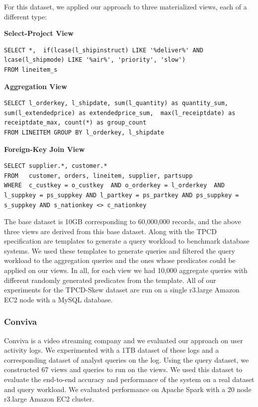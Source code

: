 For this dataset, we applied our approach to three materialized views, each of a different type:
\vspace{0.5em}


\textbf{Select-Project View}
\begin{lstlisting}
SELECT *,  if(lcase(l_shipinstruct) LIKE '%deliver%' AND lcase(l_shipmode) LIKE '%air%', 'priority', 'slow')  
FROM lineitem_s
\end{lstlisting}

\vspace{0.5em}

\textbf{Aggregation View}
\begin{lstlisting}
SELECT l_orderkey, l_shipdate, sum(l_quantity) as quantity_sum,  sum(l_extendedprice) as extendedprice_sum,  max(l_receiptdate) as receiptdate_max, count(*) as group_count 
FROM LINEITEM GROUP BY l_orderkey, l_shipdate
\end{lstlisting}

\vspace{0.5em}

\textbf{Foreign-Key Join View}
\begin{lstlisting}
SELECT supplier.*, customer.* 
FROM   customer, orders, lineitem, supplier, partsupp 
WHERE  c_custkey = o_custkey  AND o_orderkey = l_orderkey  AND l_suppkey = ps_suppkey AND l_partkey = ps_partkey AND ps_suppkey = s_suppkey AND s_nationkey <> c_nationkey
\end{lstlisting}

\vspace{1em}

The base dataset is 10GB corresponding to 60,000,000 records, and the above three views are derived from this base dataset.
Along with the TPCD specification are templates to generate a query workload to benchmark database systems.
We used these templates to generate queries and filtered the query workload to the aggregation queries and the ones whose predicates could be applied on our views.
In all, for each view we had 10,000 aggregate queries with different randomly generated predicates from the template.
All of our experiments for the TPCD-Skew dataset are run on a single r3.large Amazon EC2 node with a MySQL database.

\subsubsection{Conviva}
Conviva is a video streaming company and we evaluated our approach on user activity logs. 
We experimented with a 1TB dataset of these logs and a corresponding dataset of analyst queries on the log.
Using the query dataset, we constructed 67 views and queries to run on the views.
We used this dataset to evaluate the end-to-end accuracy and performance of the system on a real dataset and query workload.
We evaluated performance on Apache Spark with a 20 node r3.large Amazon EC2 cluster. 

